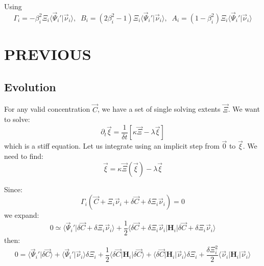 \documentclass[aps,12pt]{revtex4}
\begin{document}
Using 
\begin{equation}
	\Gamma_i = -\beta_i^2 \Xi_i \langle \vec{\Psi}_i' \vert \vec{\nu}_i \rangle,
	\;\;B_i = (2\beta_i^2-1) \Xi_i \langle \vec{\Psi}_i' \vert \vec{\nu}_i \rangle,
	\;\;A_i = (1-\beta_i^2) \Xi_i \langle \vec{\Psi}_i' \vert \vec{\nu}_i \rangle
\end{equation}



\section{PREVIOUS}

\subsection{Evolution}

For any valid concentration $\vec{C}$, we have a set of single solving extents $\vec{\Xi}$.
We want to solve:
\begin{equation}
	\partial_t \vec{\xi} = \dfrac{1}{\delta t} \left[ \kappa \vec{\Xi} - \lambda \vec{\xi} \right]
\end{equation}
which is a stiff equation. Let us integrate using an implicit step from $\vec{0}$ to $\vec{\xi}$.
We need to find:
\begin{equation}
	\vec{\xi} = \kappa \vec{\Xi}(\vec{\xi}) - \lambda \vec{\xi}
\end{equation}

Since:
\begin{equation}
	\Gamma_i(\vec{C} + \Xi_i \vec{\nu}_i + \delta\vec{C} + \delta\Xi_i \vec{\nu}_i) = 0
\end{equation}
we expand:
\begin{equation}
	0 \simeq \langle \vec{\Psi}_i' \vert \delta\vec{C} + \delta\Xi_i \vec{\nu}_i \rangle
	+ \dfrac{1}{2} \langle  \delta\vec{C} + \delta\Xi_i \vec{\nu}_i \vert \bm{H}_i \vert  \delta\vec{C} + \delta\Xi_i \vec{\nu}_i\rangle
\end{equation}
then:
\begin{equation}
	0 = \langle \vec{\Psi}_i' \vert \delta\vec{C}\rangle + \langle \vec{\Psi}_i' \vert \vec{\nu}_i \rangle \delta \Xi_i 
	+ \dfrac{1}{2} \langle \delta\vec{C} \vert \bm{H}_i \vert \delta\vec{C} \rangle
	+ \langle \delta\vec{C} \vert \bm{H}_i \vert \vec{\nu}_i \rangle \delta \Xi_i
	+ \dfrac{\delta\Xi_i^2}{2} \langle \vec{\nu}_i \vert \bm{H}_i \vert \vec{\nu}_i \rangle
\end{equation}
\end{document}
